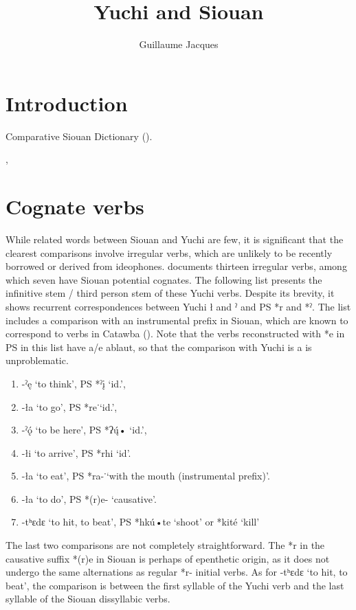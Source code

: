 \documentclass[oneside,a4paper,11pt]{article}
\newcommand{\ipa}[1]{{\phon#1}} %
\begin{document}
 
\title{Yuchi and Siouan}
\author{Guillaume Jacques}
\maketitle
\sloppy
\section{Introduction}
Comparative Siouan Dictionary (\citealt{rankin15csd}). 


\citet{helmbrecht06hocak}, \citet{ullrich08}
\section{Cognate verbs}

While related words between Siouan and Yuchi are few, it is significant that the clearest comparisons involve irregular verbs, which are unlikely to be recently borrowed or derived from ideophones. \citet[334-5]{wagner38yuchi} documents thirteen irregular verbs, among which seven have Siouan potential cognates. The following list presents the infinitive stem / third person stem of these Yuchi verbs. Despite its brevity, it shows recurrent correspondences between Yuchi \ipa{ł} and \ipa{ˀ} and PS *\ipa{r} and *\ipa{ˀ}. The list includes a comparison with an instrumental prefix in Siouan, which are known to correspond to verbs in Catawba (\citealt{rankin98proto}). Note that the verbs reconstructed with *\ipa{e} in PS in this list have \ipa{a}/\ipa{e} ablaut, so that the comparison with Yuchi is \ipa{a} is unproblematic.

\begin{enumerate}
\item   \ipa{-ˀę} ‘to think’,  PS *\ipa{ˀį} ‘id.’, 
\item \ipa{-ła} ‘to go’,  PS *\ipa{re}˙‘id.’, 
\item \ipa{-ˀǫ́} ‘to be here’,  PS *\ipa{ʔų́•} ‘id.’, 
\item \ipa{-łi} ‘to arrive’,  PS *\ipa{rhi} ‘id’. 
\item \ipa{-ła} ‘to eat’,  PS *\ipa{ra-}˙‘with the mouth (instrumental prefix)’.
\item \ipa{-ła} ‘to do’, PS *\ipa{(r)e-} `causative'.
\item \ipa{-tʰɛdɛ} ‘to hit, to beat’,  PS *\ipa{hkú•te} `shoot' or *\ipa{kité} `kill'
\end{enumerate}  
The last two comparisons are not completely straightforward. The *\ipa{r} in the causative suffix *\ipa{(r)e} in Siouan is perhaps of epenthetic origin, as it does not undergo the same alternations as regular *\ipa{r-} initial verbs. As for \ipa{-tʰɛdɛ} ‘to hit, to beat', the comparison is between the first syllable of the Yuchi verb and the last syllable of the Siouan dissyllabic verbs.
\end{document}
